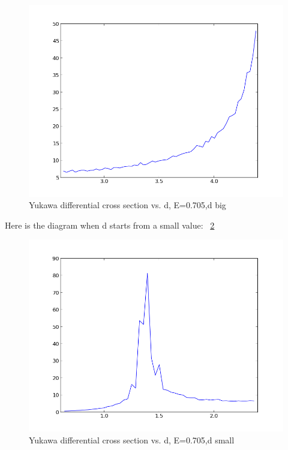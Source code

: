 \documentclass[11pt,letterpaper]{article}
\begin{document}
\begin{figure}
\begin{center}
\includegraphics[width=0.9\linewidth,angle=0]{greatd.png}
\caption{Yukawa differential cross section vs. d, E=0.705,d big}
\label{figure13}
\end{center}
\end{figure}

Here is the diagram when d starts from a small value: ~\ref{figure14}

\begin{figure}
\begin{center}
\includegraphics[width=0.9\linewidth,angle=0]{smalld.png}
\caption{Yukawa differential cross section vs. d, E=0.705,d small}
\label{figure14}
\end{center}
\end{figure}
\end{document}
